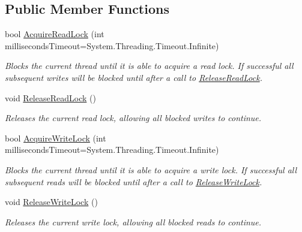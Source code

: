 \subsection*{Public Member Functions}
\begin{DoxyCompactItemize}
\item 
bool \hyperlink{class_shared_memory_1_1_buffer_with_locks_a836831324da16160986c52f8e063ff10}{Acquire\+Read\+Lock} (int milliseconds\+Timeout=System.\+Threading.\+Timeout.\+Infinite)
\begin{DoxyCompactList}\small\item\em Blocks the current thread until it is able to acquire a read lock. If successful all subsequent writes will be blocked until after a call to \hyperlink{class_shared_memory_1_1_buffer_with_locks_adb9c96d006822a210e98f71c22c05bf5}{Release\+Read\+Lock}. \end{DoxyCompactList}\item 
void \hyperlink{class_shared_memory_1_1_buffer_with_locks_adb9c96d006822a210e98f71c22c05bf5}{Release\+Read\+Lock} ()
\begin{DoxyCompactList}\small\item\em Releases the current read lock, allowing all blocked writes to continue. \end{DoxyCompactList}\item 
bool \hyperlink{class_shared_memory_1_1_buffer_with_locks_a309b191c69586043c60362e401732940}{Acquire\+Write\+Lock} (int milliseconds\+Timeout=System.\+Threading.\+Timeout.\+Infinite)
\begin{DoxyCompactList}\small\item\em Blocks the current thread until it is able to acquire a write lock. If successful all subsequent reads will be blocked until after a call to \hyperlink{class_shared_memory_1_1_buffer_with_locks_a9032d217f1f869d62ea29b3a3ea3fb98}{Release\+Write\+Lock}. \end{DoxyCompactList}\item 
void \hyperlink{class_shared_memory_1_1_buffer_with_locks_a9032d217f1f869d62ea29b3a3ea3fb98}{Release\+Write\+Lock} ()
\begin{DoxyCompactList}\small\item\em Releases the current write lock, allowing all blocked reads to continue. \end{DoxyCompactList}\end{DoxyCompactItemize}
